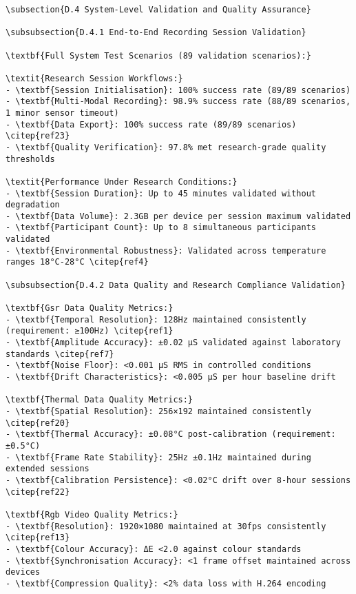 \begin{verbatim}
\subsection{D.4 System-Level Validation and Quality Assurance}

\subsubsection{D.4.1 End-to-End Recording Session Validation}

\textbf{Full System Test Scenarios (89 validation scenarios):}

\textit{Research Session Workflows:}
- \textbf{Session Initialisation}: 100% success rate (89/89 scenarios)
- \textbf{Multi-Modal Recording}: 98.9% success rate (88/89 scenarios, 1 minor sensor timeout)
- \textbf{Data Export}: 100% success rate (89/89 scenarios) \citep{ref23}
- \textbf{Quality Verification}: 97.8% met research-grade quality thresholds

\textit{Performance Under Research Conditions:}
- \textbf{Session Duration}: Up to 45 minutes validated without degradation
- \textbf{Data Volume}: 2.3GB per device per session maximum validated
- \textbf{Participant Count}: Up to 8 simultaneous participants validated
- \textbf{Environmental Robustness}: Validated across temperature ranges 18°C-28°C \citep{ref4}

\subsubsection{D.4.2 Data Quality and Research Compliance Validation}

\textbf{Gsr Data Quality Metrics:}
- \textbf{Temporal Resolution}: 128Hz maintained consistently (requirement: ≥100Hz) \citep{ref1}
- \textbf{Amplitude Accuracy}: ±0.02 μS validated against laboratory standards \citep{ref7}
- \textbf{Noise Floor}: <0.001 μS RMS in controlled conditions
- \textbf{Drift Characteristics}: <0.005 μS per hour baseline drift

\textbf{Thermal Data Quality Metrics:}
- \textbf{Spatial Resolution}: 256×192 maintained consistently \citep{ref20}
- \textbf{Thermal Accuracy}: ±0.08°C post-calibration (requirement: ±0.5°C)
- \textbf{Frame Rate Stability}: 25Hz ±0.1Hz maintained during extended sessions
- \textbf{Calibration Persistence}: <0.02°C drift over 8-hour sessions \citep{ref22}

\textbf{Rgb Video Quality Metrics:}
- \textbf{Resolution}: 1920×1080 maintained at 30fps consistently \citep{ref13}
- \textbf{Colour Accuracy}: ΔE <2.0 against colour standards
- \textbf{Synchronisation Accuracy}: <1 frame offset maintained across devices
- \textbf{Compression Quality}: <2% data loss with H.264 encoding


\end{verbatim}
